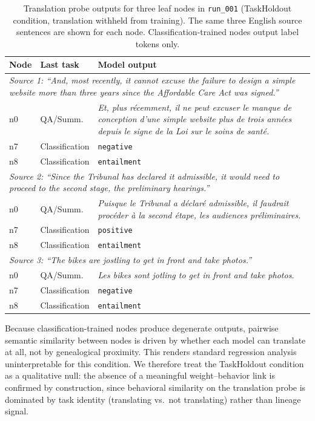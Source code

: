 \documentclass{article}
\begin{document}
\begin{table}[h]
\caption{Translation probe outputs for three leaf nodes in \texttt{run\_001}
  (TaskHoldout condition, translation withheld from training).
  The same three English source sentences are shown for each node.
  Classification-trained nodes output label tokens only.}
\label{tab:translation_probe_examples}
\small
\begin{center}
\begin{tabular}{p{2.2cm} p{1.8cm} p{8.2cm}}
\toprule
Node & Last task & Model output \\
\midrule
\multicolumn{3}{l}{\textit{Source 1: ``And, most recently, it cannot excuse the failure to design a simple website more than three years since the Affordable Care Act was signed.''}} \\
n0  & QA/Summ.  & \textit{Et, plus r\'{e}cemment, il ne peut excuser le manque de conception d'une simple website plus de trois ann\'{e}es depuis le signe de la Loi sur le soins de sant\'{e}.} \\
n7  & Classification & \texttt{negative} \\
n8  & Classification & \texttt{entailment} \\
\midrule
\multicolumn{3}{l}{\textit{Source 2: ``Since the Tribunal has declared it admissible, it would need to proceed to the second stage, the preliminary hearings.''}} \\
n0  & QA/Summ.  & \textit{Puisque le Tribunal a d\'{e}clar\'{e} admissible, il faudrait proc\'{e}der \`{a} la second \'{e}tape, les audiences pr\'{e}liminaires.} \\
n7  & Classification & \texttt{positive} \\
n8  & Classification & \texttt{entailment} \\
\midrule
\multicolumn{3}{l}{\textit{Source 3: ``The bikes are jostling to get in front and take photos.''}} \\
n0  & QA/Summ.  & \textit{Les bikes sont jotling to get in front and take photos.} \\
n7  & Classification & \texttt{negative} \\
n8  & Classification & \texttt{entailment} \\
\bottomrule
\end{tabular}
\end{center}
\end{table}

Because classification-trained nodes produce degenerate outputs, pairwise semantic
similarity between nodes is driven by whether each model can translate at all,
not by genealogical proximity. This renders standard regression analysis
uninterpretable for this condition. We therefore treat the TaskHoldout condition
as a qualitative null: the absence of a meaningful weight--behavior link is
confirmed by construction, since behavioral similarity on the translation probe
is dominated by task identity (translating vs.\ not translating) rather than
lineage signal.
\end{document}
